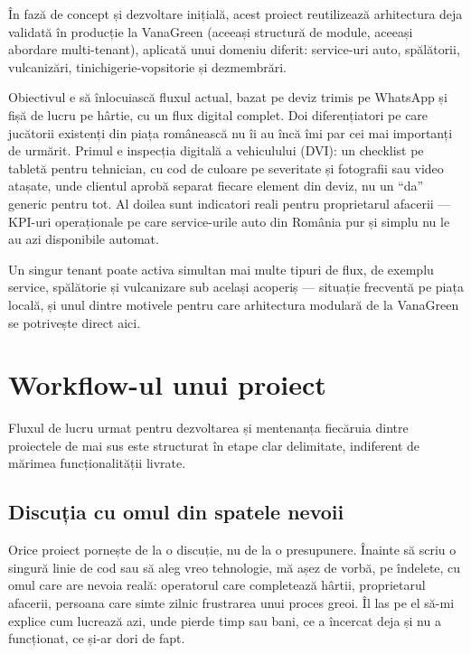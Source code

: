 \documentclass[11pt, a4paper]{article}
\begin{document}
În fază de concept și dezvoltare inițială, acest proiect reutilizează arhitectura deja validată
în producție la VanaGreen (aceeași structură de module, aceeași abordare multi-tenant), aplicată
unui domeniu diferit: service-uri auto, spălătorii, vulcanizări, tinichigerie-vopsitorie și
dezmembrări.

Obiectivul e să înlocuiască fluxul actual, bazat pe deviz trimis pe WhatsApp și fișă de lucru pe
hârtie, cu un flux digital complet. Doi diferențiatori pe care jucătorii existenți din piața
românească nu îi au încă îmi par cei mai importanți de urmărit. Primul e inspecția digitală a
vehiculului (DVI): un checklist pe tabletă pentru tehnician, cu cod de culoare pe severitate și
fotografii sau video atașate, unde clientul aprobă separat fiecare element din deviz, nu un
``da'' generic pentru tot. Al doilea sunt indicatori reali pentru proprietarul afacerii — KPI-uri
operaționale pe care service-urile auto din România pur și simplu nu le au azi disponibile
automat.

Un singur tenant poate activa simultan mai multe tipuri de flux, de exemplu service, spălătorie
și vulcanizare sub același acoperiș — situație frecventă pe piața locală, și unul dintre motivele
pentru care arhitectura modulară de la VanaGreen se potrivește direct aici.


\section{Workflow-ul unui proiect}

Fluxul de lucru urmat pentru dezvoltarea și mentenanța fiecăruia dintre proiectele de mai sus
este structurat în etape clar delimitate, indiferent de mărimea funcționalității livrate.

\subsection{Discuția cu omul din spatele nevoii}

Orice proiect pornește de la o discuție, nu de la o presupunere. Înainte să scriu o singură
linie de cod sau să aleg vreo tehnologie, mă așez de vorbă, pe îndelete, cu omul care are nevoia
reală: operatorul care completează hârtii, proprietarul afacerii, persoana care simte zilnic
frustrarea unui proces greoi. Îl las pe el să-mi explice cum lucrează azi, unde pierde timp
sau bani, ce a încercat deja și nu a funcționat, ce și-ar dori de fapt.
\end{document}
